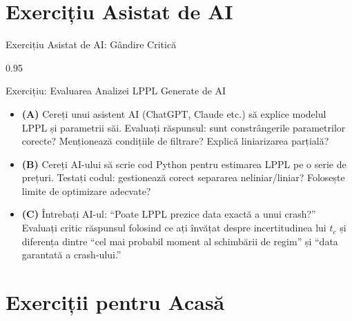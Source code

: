\documentclass[9pt, aspectratio=169, t]{beamer}
\begin{document}
\section{Exercițiu Asistat de AI}

\begin{frame}{Exercițiu Asistat de AI: Gândire Critică}
    \begin{cminipage}{0.95\textwidth}
    \begin{block}{Exercițiu: Evaluarea Analizei LPPL Generate de AI}
        {\small
        \begin{itemize}\setlength{\itemsep}{3pt}
            \item \textcolor{MainBlue}{\textbf{(A)}} Cereți unui asistent AI (ChatGPT, Claude etc.) să explice modelul LPPL și parametrii săi. Evaluați răspunsul: sunt constrângerile parametrilor corecte? Menționează condițiile de filtrare? Explică liniarizarea parțială?
            \item \textcolor{MainBlue}{\textbf{(B)}} Cereți AI-ului să scrie cod Python pentru estimarea LPPL pe o serie de prețuri. Testați codul: gestionează corect separarea neliniar/liniar? Folosește limite de optimizare adecvate?
            \item \textcolor{MainBlue}{\textbf{(C)}} Întrebați AI-ul: ``Poate LPPL prezice data exactă a unui crash?'' Evaluați critic răspunsul folosind ce ați învățat despre incertitudinea lui $t_c$ și diferența dintre ``cel mai probabil moment al schimbării de regim'' și ``data garantată a crash-ului.''
        \end{itemize}
        }
    \end{block}
    \end{cminipage}
\end{frame}

\section{Exerciții pentru Acasă}
\end{document}

